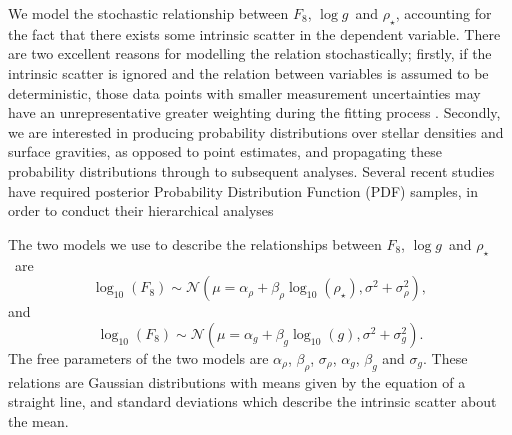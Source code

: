 \documentclass[apjl]{emulateapj}
\newcommand{\logg}{$\log g$}
\newcommand{\rhostar}{$\rho_{\star}$}
\begin{document}
We model the stochastic relationship between $F_8$, \logg\ and \rhostar,
accounting for the fact that there exists some intrinsic scatter in
the dependent variable.
There are two excellent reasons for modelling the relation stochastically;
firstly, if the intrinsic scatter is ignored and the relation between
variables is assumed to be deterministic, those data points with smaller
measurement uncertainties may have an unrepresentative greater weighting
during the fitting process \citep{hogg:2010b}.
Secondly, we are interested in producing probability distributions over
stellar densities and surface gravities, as opposed to point estimates, and
propagating these probability distributions through to subsequent analyses.
Several recent studies have required posterior Probability Distribution
Function (PDF) samples, in order to conduct their hierarchical analyses
\citep[e.g.][]{foreman-mackey:2014, rogers:2015, angus:2015}


The two models we use to describe the relationships between $F_8$, \logg\ and
\rhostar\ are
\begin{equation}
	\log_{10}(F_8) \sim \mathcal{N} \left(\mu = \alpha_\rho +
    \beta_\rho \log_{10}(\rho_\star), \sigma^2 + \sigma_\rho^2 \right),
\end{equation}
\label{eq:rho}
and
\begin{equation}
	\log_{10}(F_8) \sim \mathcal{N} \left(\mu = \alpha_g + \beta_g
    \log_{10}(g), \sigma^2 + \sigma_g^2 \right).
\end{equation}
\label{eq:logg}
The free parameters of the two models are $\alpha_\rho$, $\beta_\rho$,
$\sigma_\rho$, $\alpha_g$, $\beta_g$ and $\sigma_g$.
These relations are Gaussian distributions with means given by the equation of
a straight line, and standard deviations which describe the intrinsic scatter
about the mean.
\end{document}
